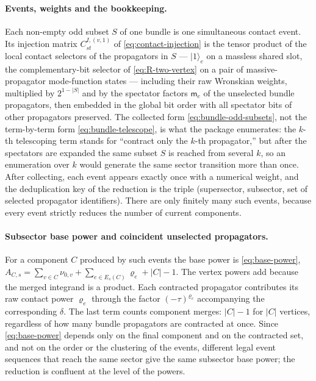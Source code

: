 \documentclass[11pt,a4paper]{article}
\numberwithin{table}{section}
\begin{document}
\paragraph{Events, weights and the bookkeeping.}
Each non-empty odd subset $S$ of one bundle is one simultaneous contact event. Its injection matrix
$C^{I,(v,1)}_{st}$ of \eqref{eq:contact-injection} is the tensor product of the local contact
selectors of the propagators in $S$ --- $|1\rangle_e$ on a massless shared slot, the complementary-bit
selector of \eqref{eq:R-two-vertex} on a pair of massive-propagator mode-function states --- including
their raw Wronskian weights, multiplied by $2^{1-|S|}$ and
by the spectator factors $\mathsf m_e$ of the unselected bundle propagators, then embedded in the global
bit order with all spectator bits of other propagators preserved. The collected form
\eqref{eq:bundle-odd-subsets}, not the term-by-term form \eqref{eq:bundle-telescope}, is what the
package enumerates: the $k$-th telescoping term stands for ``contract only the $k$-th propagator,'' but
after the spectators are expanded the same subset $S$ is reached from several $k$, so an
enumeration over $k$ would generate the same sector transition more than once. After collecting,
each event appears exactly once with a numerical weight, and the deduplication key of the reduction
is the triple (supersector, subsector, set of selected propagator identifiers). There are only
finitely many such events, because every event strictly reduces the number of current components.

\paragraph{Subsector base power and coincident unselected propagators.}
For a component $C$ produced by such events the base power is \eqref{eq:base-power},
$A_{C,s}=\sum_{v\in C}\nu_{0,v}+\sum_{e\in E_s(C)}\varrho_e+|C|-1$.
The vertex powers add because the merged integrand is a product.
Each contracted propagator contributes its raw contact power $\varrho_e$ through the factor
$(-\tau)^{\varrho_e}$ accompanying the corresponding $\delta$.
The last term counts component merges: $|C|-1$ for $|C|$ vertices, regardless of how many
bundle propagators are contracted at once. Since \eqref{eq:base-power} depends only on the final component and on
the contracted set, and not on the order or the clustering of the events, different legal event
sequences that reach the same sector give the same subsector base power; the reduction is confluent at
the level of the powers.
\end{document}
